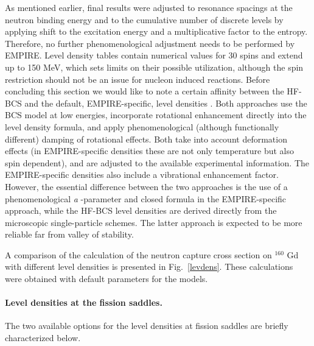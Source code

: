 As mentioned earlier, final results were adjusted to resonance spacings at
the neutron binding energy and to the cumulative number of discrete levels
by applying shift to the excitation energy and a multiplicative factor to
the entropy. Therefore, no further phenomenological adjustment needs to be
performed by EMPIRE. Level density tables contain numerical values for 30
spins and extend up to 150 MeV, which sets limits on their possible
utilization, although the spin restriction should not be an issue for nucleon
induced reactions. Before concluding this section we would like to note
a certain affinity between the HF-BCS%
 and the default, EMPIRE-specific, level densities%
. Both approaches use the BCS%
 model at low energies, incorporate rotational enhancement
directly into the level density formula, and apply phenomenological
(although functionally different) damping of rotational effects. Both take
into account deformation effects (in EMPIRE-specific densities these are not
only temperature but also spin dependent), and are adjusted to the available
experimental information. The EMPIRE-specific densities also include a
vibrational enhancement factor. However, the essential difference
between the two approaches is the use of a phenomenological \emph{a}%
-parameter and closed formula in the EMPIRE-specific approach, while
the HF-BCS%
 level densities%
 are derived directly from the microscopic
single-particle schemes. The latter approach is expected to be more reliable
far from valley of stability.

A comparison of the calculation of the neutron capture cross section on $^{160}$%
Gd with different level densities is presented in Fig.~\ref{levdens}. These
calculations were obtained with default parameters for the models.

\medskip

\paragraph{Level densities at the fission saddles.\label{ldsaddle}}

The two available options for the level densities at fission saddles are briefly
characterized below.

